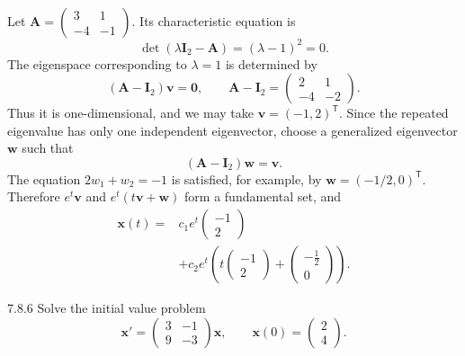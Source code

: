 \documentclass[11pt,oneside]{article}
\begin{document}
\begin{solution}
Let $\mathbf{A}=\begin{pmatrix}3&1\\-4&-1\end{pmatrix}$. Its characteristic equation is
\[
    \det(\lambda\mathbf{I}_2-\mathbf{A})=(\lambda-1)^2=0.
\]
The eigenspace corresponding to $\lambda=1$ is determined by
\[
    (\mathbf{A}-\mathbf{I}_2)\mathbf{v}=\mathbf{0},
    \qquad
    \mathbf{A}-\mathbf{I}_2=\begin{pmatrix}2&1\\-4&-2\end{pmatrix}.
\]
Thus it is one-dimensional, and we may take $\mathbf{v}=(-1,2)^{\mathsf T}$. Since the repeated eigenvalue has only one independent eigenvector, choose a generalized eigenvector $\mathbf{w}$ such that
\[
    (\mathbf{A}-\mathbf{I}_2)\mathbf{w}=\mathbf{v}.
\]
The equation $2w_1+w_2=-1$ is satisfied, for example, by $\mathbf{w}=(-1/2,0)^{\mathsf T}$. Therefore $e^t\mathbf{v}$ and $e^t(t\mathbf{v}+\mathbf{w})$ form a fundamental set, and
\[
    \boxed{\begin{aligned}
       \mathbf{x}(t)={}&c_1e^t\begin{pmatrix}-1\\2\end{pmatrix}\\
        &+c_2e^t\left(
        t\begin{pmatrix}-1\\2\end{pmatrix}
        +\begin{pmatrix}-\frac12\\0\end{pmatrix}\right).
    \end{aligned}}
\]
\end{solution}

\begin{problem}{7.8.6}
Solve the initial value problem
\[
    \mathbf{x}'=
    \begin{pmatrix}
        3&-1\\
        9&-3
    \end{pmatrix}\mathbf{x},
    \qquad
    \mathbf{x}(0)=\begin{pmatrix}2\\4\end{pmatrix}.
\]
\end{problem}
\end{document}
